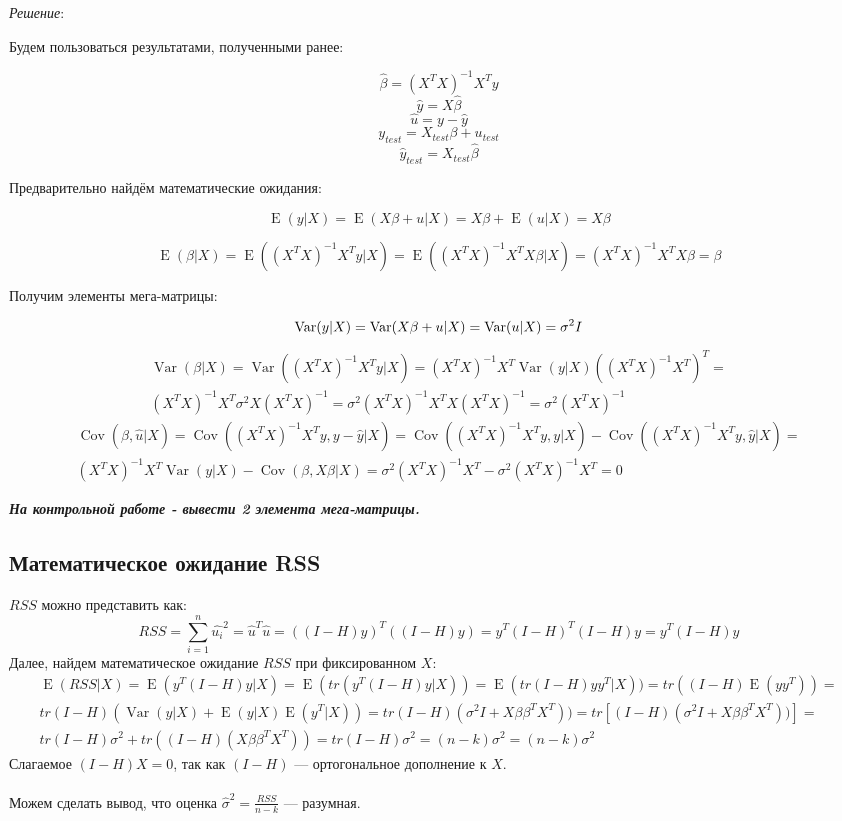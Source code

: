 \documentclass[12pt]{article} %
\theoremstyle{definition} %
\DeclareMathOperator{\Cov}{Cov}
\DeclareMathOperator{\Var}{Var}
\DeclareMathOperator{\E}{E}
\begin{document}
\textit{Решение}:

Будем пользоваться результатами, полученными ранее:

\[
 \hat\beta=(X^TX)^{-1}X^Ty
\]
\[
 \hat{y}=X\hat\beta
\]
\[
 \hat{u}=y-\hat{y}
 \]
\[
  y_{test}=X_{test}\beta+u_{test}
\]
\[
 \hat{y}_{test}=X_{test}\hat{\beta}
\]

\indent Предварительно найдём математические ожидания:

\[
\E(y|X)=\E(X\beta+u|X)=X\beta+\E(u|X)=X\beta
\]

\[
\E(\beta|X)=\E((X^TX)^{-1}X^Ty|X)=\E((X^TX)^{-1}X^TX\beta|X)=(X^TX)^{-1}X^TX\beta=\beta
\]

\indent Получим элементы мега-матрицы:

\[
\Var(y|X)=\Var(X\beta+u|X)=\Var(u|X)=\sigma^2I\\
\]
\begin{eqnarray*}
\Var(\beta|X)=\Var((X^TX)^{-1}X^Ty|X)=(X^TX)^{-1}X^T\Var(y|X)((X^TX)^{-1}X^T)^T=\\
(X^TX)^{-1}X^T\sigma^2 X(X^TX)^{-1}=\sigma^2 (X^TX)^{-1}X^TX(X^TX)^{-1}= \sigma^2 (X^TX)^{-1}
\end{eqnarray*}
\begin{eqnarray*}
\Cov(\hat{\beta},\hat{u}|X)=\Cov((X^TX)^{-1}X^Ty, y-\hat{y}|X)=
\Cov((X^TX)^{-1}X^Ty,y|X)-\Cov((X^TX)^{-1}X^Ty,\hat{y}|X)=\\
(X^TX)^{-1}X^T\Var(y|X)-\Cov(\beta,X\beta|X)
=\sigma^2(X^TX)^{-1}X^T-\sigma^2(X^TX)^{-1}X^T=0
\end{eqnarray*}

\textit{\textbf{На контрольной работе - вывести 2 элемента мега-матрицы.}}

\subsection{Математическое ожидание RSS}
$RSS$ можно представить как:\\
\[
RSS=\sum\limits_{i=1}^n  \hat{u_i}^2=\hat{u}^T\hat{u}=((I-H)y)^T((I-H)y)=
y^T(I-H)^T(I-H)y=y^T(I-H)y
\]
Далее, найдем математическое ожидание $RSS$ при фиксированном $X$:
\begin{eqnarray*}
\E(RSS|X)=\E(y^T(I-H)y|X)=\E(tr(y^T(I-H)y|X))=\E(tr(I-H)yy^T|X))=tr((I-H)\E(yy^T))=\\
tr(I-H)(\Var(y|X)+\E(y|X)\E(y^T|X))=tr(I-H)(\sigma^2I+X\beta\beta^TX^T))=tr[(I-H)(\sigma^2I+X\beta\beta^TX^T))]=\\
tr(I-H)\sigma^2+tr((I-H)(X\beta\beta^TX^T))=tr(I-H)\sigma^2=(n-k)\sigma^2=(n-k)\sigma^2
\end{eqnarray*}
Слагаемое $(I-H)X=0$, так как $(I-H)$ — ортогональное дополнение к $X$.\\\\
Можем сделать вывод, что оценка $\hat{\sigma}^2=\frac{RSS}{n-k}$ — разумная.
\end{document}
